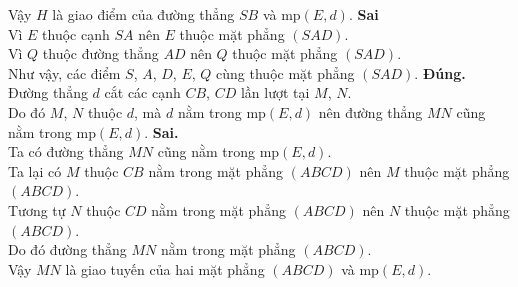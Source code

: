 \begin{ex}
{\begin{itemchoice}
   Vậy $H$  là giao điểm của đường thẳng $SB$ và mp$(E,d)$.
    \itemch \textbf{Sai}\\
   Vì $E$ thuộc cạnh  $SA$ nên $E$ thuộc mặt phẳng $(SAD)$.\\
   Vì $Q$ thuộc đường  thẳng $AD$ nên $Q$ thuộc mặt phẳng $(SAD)$.\\
   Như vậy, các điểm $S$, $A$, $D$, $E$, $Q$ cùng thuộc mặt  phẳng $(SAD)$.
   \itemch  \textbf{Đúng.}\\
   Đường thẳng  $d$ cắt các cạnh $CB$, $CD$ lần lượt tại $M$, $N$.\\
   Do đó $M$, $N$ thuộc $d$, mà $d$  nằm trong mp$(E,d)$ nên đường thẳng $MN$ cũng nằm trong mp$(E,d)$.
   \itemch  \textbf{Sai.}\\
   Ta có đường  thẳng $MN$ cũng nằm trong mp$(E,d)$.\\
   Ta lại có  $M$ thuộc $CB$ nằm trong mặt phẳng $(ABCD)$ nên $M$ thuộc mặt phẳng $(ABCD)$.\\
   Tương tự $N$ thuộc  $CD$ nằm trong mặt phẳng $(ABCD)$ nên $N$ thuộc mặt phẳng $(ABCD)$.\\
   Do đó đường  thẳng $MN$ nằm trong mặt phẳng $(ABCD)$.\\
   Vậy $MN$ là giao tuyến của hai mặt phẳng  $(ABCD)$ và mp$(E,d)$.
  \end{itemchoice}
 } 
\end{ex}

